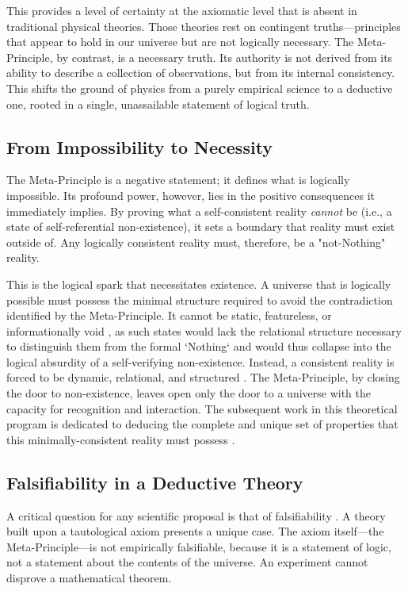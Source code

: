 \documentclass[axioms,article,submit,pdftex,oneauthor]{Definitions/mdpi}
\begin{document}
This provides a level of certainty at the axiomatic level that is absent in traditional physical theories. Those theories rest on contingent truths—principles that appear to hold in our universe but are not logically necessary. The Meta-Principle, by contrast, is a necessary truth. Its authority is not derived from its ability to describe a collection of observations, but from its internal consistency. This shifts the ground of physics from a purely empirical science to a deductive one, rooted in a single, unassailable statement of logical truth.

\subsection{From Impossibility to Necessity}
The Meta-Principle is a negative statement; it defines what is logically impossible. Its profound power, however, lies in the positive consequences it immediately implies. By proving what a self-consistent reality \textit{cannot} be (i.e., a state of self-referential non-existence), it sets a boundary that reality must exist outside of. Any logically consistent reality must, therefore, be a "not-Nothing" reality.

This is the logical spark that necessitates existence. A universe that is logically possible must possess the minimal structure required to avoid the contradiction identified by the Meta-Principle. It cannot be static, featureless, or informationally void \cite{shannon1948mathematical, chaitin2001exploring}, as such states would lack the relational structure necessary to distinguish them from the formal `Nothing` and would thus collapse into the logical absurdity of a self-verifying non-existence. Instead, a consistent reality is forced to be dynamic, relational, and structured \cite{wheeler1990it}. The Meta-Principle, by closing the door to non-existence, leaves open only the door to a universe with the capacity for recognition and interaction. The subsequent work in this theoretical program is dedicated to deducing the complete and unique set of properties that this minimally-consistent reality must possess \cite{baez2009rosetta}.

\subsection{Falsifiability in a Deductive Theory}
A critical question for any scientific proposal is that of falsifiability \cite{popper1959logic}. A theory built upon a tautological axiom presents a unique case. The axiom itself—the Meta-Principle—is not empirically falsifiable, because it is a statement of logic, not a statement about the contents of the universe. An experiment cannot disprove a mathematical theorem.
\end{document}
